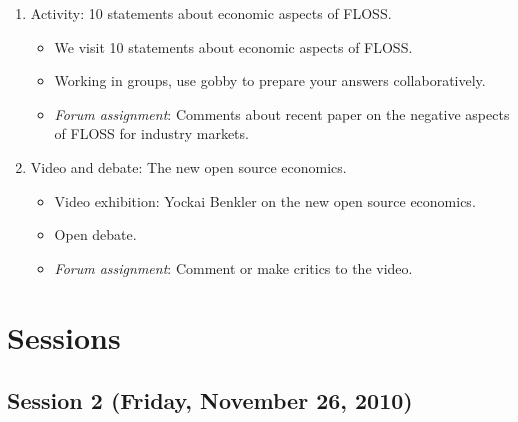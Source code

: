 \documentclass[a4paper]{article}
\begin{document}
\begin{itemize}
\begin{enumerate}
     \item Activity: 10 statements about economic aspects of FLOSS.
	  \begin{itemize}
	   \item We visit 10 statements about economic aspects of FLOSS.
	   \item Working in groups, use gobby to prepare your answers collaboratively.
	   \item \textit{Forum assignment}: Comments about recent paper on the negative aspects of FLOSS for industry markets.
	  \end{itemize}

     \item Video and debate: The new open source economics.

	  \begin{itemize}
	   \item Video exhibition: Yockai Benkler on the new open source economics.
	   \item Open debate.
	   \item \textit{Forum assignment}: Comment or make critics to the video.
	  \end{itemize}

    \end{enumerate}

\end{itemize}

\section{Sessions}

\subsection{Session 2 (Friday, November 26, 2010)}
\end{document}
